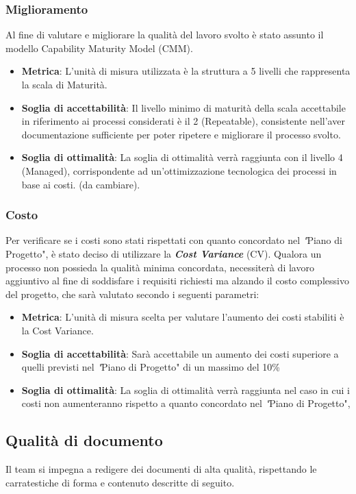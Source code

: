 \subsubsection{Miglioramento}
Al fine di valutare e migliorare la qualità del lavoro svolto è stato assunto il modello Capability Maturity Model (CMM).
\begin{itemize}
	\item \textbf{Metrica}: L'unità di misura utilizzata è la struttura a 5 livelli che rappresenta la scala di Maturità.
	\item \textbf{Soglia di accettabilità}: Il livello minimo di maturità della scala accettabile in riferimento ai processi considerati è il 2 (Repeatable), consistente nell'aver documentazione sufficiente per poter ripetere e migliorare il processo svolto.
	\item \textbf{Soglia di ottimalità}: La soglia di ottimalità verrà raggiunta con il livello 4 (Managed), corrispondente ad un'ottimizzazione tecnologica dei processi in base ai costi. (da cambiare).
\end{itemize}
\subsubsection{Costo}
Per verificare se i costi sono stati rispettati con quanto concordato nel  \textit"{Piano di Progetto}", è stato deciso di utilizzare la \textit{\textbf{Cost Variance}} (CV).
Qualora un processo non possieda la qualità minima concordata, necessiterà di lavoro aggiuntivo al fine di soddisfare i requisiti richiesti ma alzando il costo complessivo del progetto, che sarà valutato secondo i seguenti parametri:
\begin{itemize}
	\item \textbf{Metrica}: L'unità di misura scelta per valutare l'aumento dei costi stabiliti è la Cost Variance.
	\item \textbf{Soglia di accettabilità}: Sarà accettabile un aumento dei costi superiore a quelli previsti nel \textit"{Piano di Progetto}" di un massimo del 10\%
	\item \textbf{Soglia di ottimalità}: La soglia di ottimalità verrà raggiunta nel caso in cui i costi non aumenteranno rispetto a quanto concordato nel \textit"{Piano di Progetto}", 
\end{itemize}
\subsection{Qualità di documento}
Il team si impegna a redigere dei documenti di alta qualità, rispettando le carratestiche di forma e contenuto descritte di seguito.
